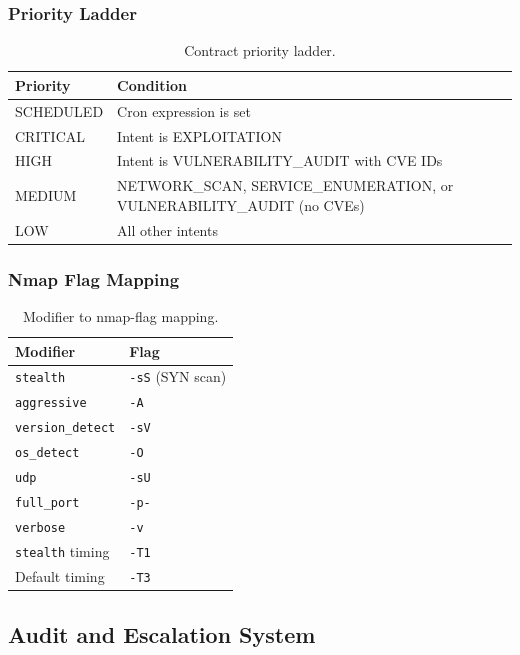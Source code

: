 ﻿\documentclass[10pt,journal,onecolumn]{IEEEtran}
\begin{document}
\subsubsection{Priority Ladder}
\begin{table}[h]
\caption{Contract priority ladder.}
\label{tab:priority}
\begin{tabularx}{\columnwidth}{l X}
\toprule
\textbf{Priority} & \textbf{Condition}\\
\midrule
SCHEDULED & Cron expression is set\\
CRITICAL & Intent is EXPLOITATION\\
HIGH & Intent is VULNERABILITY\_AUDIT with CVE IDs\\
MEDIUM & NETWORK\_SCAN, SERVICE\_ENUMERATION, or VULNERABILITY\_AUDIT (no CVEs)\\
LOW & All other intents\\
\bottomrule
\end{tabularx}
\end{table}

\subsubsection{Nmap Flag Mapping}
\begin{table}[h]
\caption{Modifier to nmap-flag mapping.}
\label{tab:nmapflags}
\begin{tabularx}{\columnwidth}{>{\ttfamily}l >{\ttfamily}l}
\toprule
\textbf{Modifier} & \textbf{Flag}\\
\midrule
\texttt{stealth} & \texttt{-sS} (SYN scan)\\
\texttt{aggressive} & \texttt{-A}\\
\texttt{version\_detect} & \texttt{-sV}\\
\texttt{os\_detect} & \texttt{-O}\\
\texttt{udp} & \texttt{-sU}\\
\texttt{full\_port} & \texttt{-p-}\\
\texttt{verbose} & \texttt{-v}\\
\texttt{stealth} timing & \texttt{-T1}\\
Default timing & \texttt{-T3}\\
\bottomrule
\end{tabularx}
\end{table}

\subsection{Audit and Escalation System}
\end{document}
